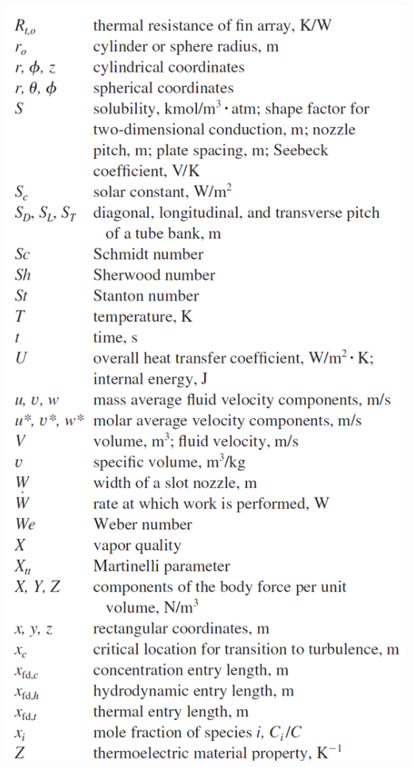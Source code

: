 \documentclass[10pt,landscape]{article}
\newenvironment{Figure}
     {\par\medskip\noindent\minipage{\linewidth}}
     {\endminipage\par\medskip}
\begin{document}
\begin{multicols}{3}
\begin{Figure}
    \includegraphics[width=\linewidth]{Symbols_5.png}
\end{Figure}
\begin{Figure}
    \centering

\end{Figure}
\end{multicols}
\end{document}

